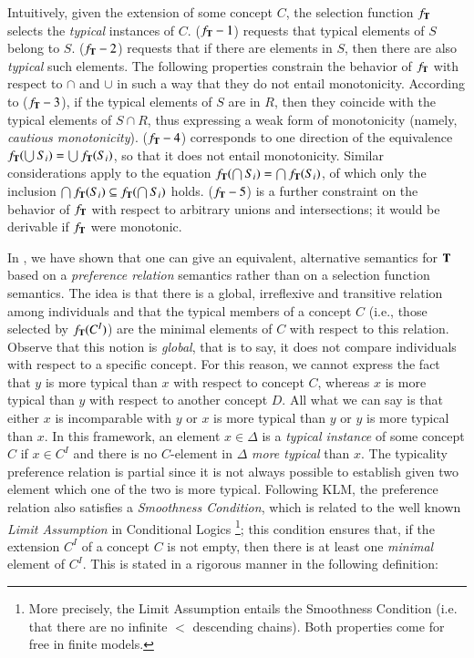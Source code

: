 \documentclass[a4paper, 11pt, oneside]{elsarticle}
\newcommand{\tip}{{\bf T}}
\newcommand{\incluso} {\subseteq}
\begin{document}
\noindent Intuitively, given the extension of some concept $C$,
the selection function $f_\tip$ selects  the {\em typical}
instances of $C$. ($f_\tip-1$) requests that typical elements of
$S$ belong to $S$. ($f_\tip-2$) requests that if there are
elements in $S$, then there are also {\em typical} such elements.
The following properties constrain the behavior of $f_\tip$ with
respect to $\cap$ and $\cup$ in such a way that they do not entail
monotonicity. According to ($f_\tip-3$), if the typical elements
of $S$ are in $R$, then they coincide with the typical elements of
$S \cap R$, thus expressing a weak form of monotonicity (namely,
{\em cautious monotonicity}). ($f_\tip-4$) corresponds to one
direction of the equivalence $f_\tip(\bigcup S_i) = \bigcup
f_\tip(S_i)$, so that it does not entail monotonicity. Similar
considerations apply to the equation $f_\tip(\bigcap S_i) =
\bigcap f_\tip(S_i)$, of which only the inclusion $\bigcap
f_\tip(S_i) \incluso f_\tip(\bigcap S_i)$ holds. ($f_\tip-5$) is a
further constraint on the behavior of $f_\tip$ with respect to
arbitrary unions and intersections; it would be derivable if
$f_\tip$ were monotonic.



In \cite{FI09}, we have shown that one can give an equivalent,
alternative semantics for $\tip$ based on a \emph{preference
relation} semantics rather than on a selection function semantics.
The idea is that there is a global, irreflexive and transitive
relation among individuals and that the typical members of a
concept $C$ (i.e., those selected by $f_\tip(C^I)$) are the
minimal elements of $C$ with respect to this relation. Observe
that this notion is \emph{global}, that is to say, it does not
compare individuals with respect to a specific concept. For this
reason,  we cannot express the fact that  $y$ is more typical than
$x$ with respect to concept $C$, whereas $x$ is more typical than
$y$ with respect to another concept $D$. All what we can say is
that either $x$ is incomparable with $y$ or $x$ is more typical
than $y$ or $y$ is more typical than $x$. In this framework, an
element $x \in \Delta$ is a {\em typical instance} of some concept
$C$ if $x \in C^I$ and there is no $C$-element in $\Delta$ {\em
more typical} than $x$. The typicality preference relation is
partial since it is not always possible to establish given two
element which one of the two is more typical. Following KLM, the
preference relation also satisfies a \emph{Smoothness Condition},
which is related to the well known \emph{Limit Assumption} in
Conditional Logics \cite{Nute80} \footnote{More precisely,
the Limit Assumption entails the Smoothness Condition (i.e. that
there are no infinite $<$ descending chains). Both properties come
for free in finite models.}; this condition ensures that, if the
extension $C^I$ of a concept $C$ is not empty, then there is at
least one \emph{minimal} element of $C^I$. This is stated in a
rigorous manner in the following definition:
\end{document}
